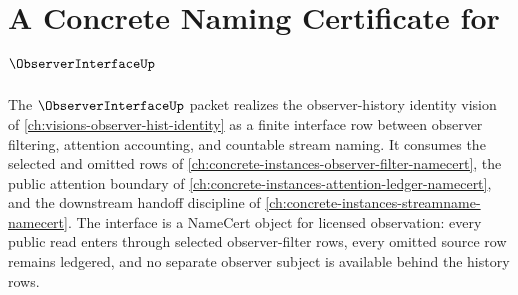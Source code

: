 \chapter{A Concrete Naming Certificate for $\ObserverInterfaceUp$}
\label{ch:concrete-instances-observer-interface-namecert}

The $\ObserverInterfaceUp$ packet realizes the observer-history identity vision of \autoref{ch:visions-observer-hist-identity} as a finite interface row between observer filtering, attention accounting, and countable stream naming. It consumes the selected and omitted rows of \autoref{ch:concrete-instances-observer-filter-namecert}, the public attention boundary of \autoref{ch:concrete-instances-attention-ledger-namecert}, and the downstream handoff discipline of \autoref{ch:concrete-instances-streamname-namecert}. The interface is a NameCert object for licensed observation: every public read enters through selected observer-filter rows, every omitted source row remains ledgered, and no separate observer subject is available behind the history rows.

